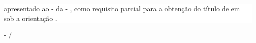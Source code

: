 \begin{center}
	\vskip 2cm
	
	\colorbox{white}{\begin{minipage}[t][2.6cm][t]{\textwidth}
			\begin{center}
				{\fontsize{16pt}{16pt}\selectfont \MakeUppercase{\tituloTRAB}}
			\end{center}
	\end{minipage}}
	
	\vskip 1.2cm
	
	\colorbox{white}{\begin{minipage}[t][1.6cm][t]{\textwidth}
			\begin{center}
				{\fontsize{12pt}{12pt}\selectfont \MakeUppercase{\academicoUmTRAB \break \academicoDoisTRAB \break \academicoTresTRAB}}
			\end{center}
	\end{minipage}}
	
	\vskip 1cm
	
	\colorbox{white}{\begin{minipage}[t][5cm][t]{\textwidth-1cm}
			\begin{flushright}
				\begin{minipage}{7cm}
					\fontsize{12pt}{12pt}\selectfont
					{\denominacaoExtensaTrabalhoTRAB } apresentado ao { \campusInstituicaoTRAB } - {\siglaCampusInstituicaoTRAB } da { \instituicaoTRAB } - { \siglaInstituicaoTRAB}, como requisito parcial para a obtenção do título de { \grauFormacaoTRAB } em { \cursoTRAB } sob a orientação { \preposicaoOrientadorTRAB } { \titulcaoOrientadorTRAB } {\nomeOrientadorTRAB}.
				\end{minipage}
			\end{flushright}
	\end{minipage}}

	\vspace*{\fill}
	
	{\fontsize{12pt}{12pt}\selectfont \MakeUppercase{{\cidadeTRAB } - {\siglaEstadoTRAB}}}
	\break
	{\fontsize{12pt}{12pt}\selectfont \MakeUppercase{\mesTRAB/\anoTRAB}}
	
\end{center}
\clearpage
\thispagestyle{empty}
\newpage


